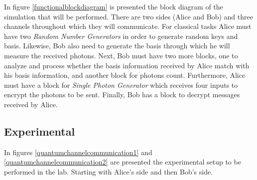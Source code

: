 In figure \ref{functionalblockdiagram} is presented the block diagram of the simulation that will be performed. There are two sides (Alice and Bob) and three channels throughout which they will communicate. For classical tasks Alice must have two \textit{Random Number Generators} in order to generate random keys and basis. Likewise, Bob also need to generate the basis through which he will measure the received photons. Next, Bob must have two more blocks, one to analyze and process whether the basis information received by Alice match with his basis information, and another block for photons count. Furthermore, Alice must have a block for \textit{Single Photon Generator} which receives four inputs to encrypt the photons to be sent. Finally, Bob has a block to decrypt messages received by Alice.

\subsection{Experimental}
In figures \ref{quantumchannelcommunication1} and \ref{quantumchannelcommunication2} are presented the experimental setup to be performed in the lab. Starting with Alice's side and then Bob's side.

